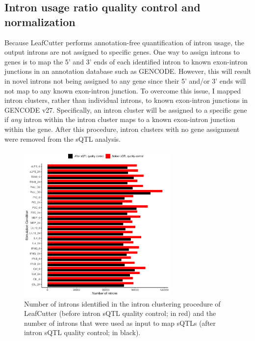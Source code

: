\subsection{Intron usage ratio quality control and normalization}
\label{sec:intron_qc_methods}
Because LeafCutter performs annotation-free quantification of intron usage, the output introns are not assigned to specific genes. One way to assign introns to genes is to map the 5' and 3' ends of each identified intron to known exon-intron junctions in an annotation database such as GENCODE. However, this will result in novel introns not being assigned to any gene since their 5' and/or 3' ends will not map to any known exon-intron junction. To overcome this issue, I mapped intron clusters, rather than individual introns, to known exon-intron junctions in GENCODE v27. Specifically, an intron cluster will be assigned to a specific gene if \textit{any} intron within the intron cluster maps to a known exon-intron junction within the gene. After this procedure, intron clusters with no gene assignment were removed from the sQTL analysis. 

\begin{figure}[H]
  \centering
  \includegraphics[width=0.7\textwidth]{qc_introns_num}
  \caption[Number of introns before and after intron quality control]{Number of introns identified in the intron clustering procedure of
  LeafCutter (before intron sQTL quality control; in red) and the number of introns that were
  used as input to map sQTLs (after intron sQTL quality control; in black).}
  \label{fig:qc_introns_num}   
\end{figure}

